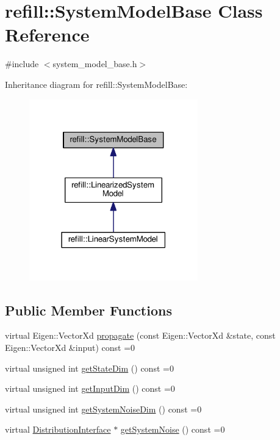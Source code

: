 \hypertarget{classrefill_1_1SystemModelBase}{}\section{refill\+:\+:System\+Model\+Base Class Reference}
\label{classrefill_1_1SystemModelBase}


{\ttfamily \#include $<$system\+\_\+model\+\_\+base.\+h$>$}



Inheritance diagram for refill\+:\+:System\+Model\+Base\+:\nopagebreak
\begin{figure}[H]
\begin{center}
\leavevmode
\includegraphics[width=207pt]{classrefill_1_1SystemModelBase__inherit__graph}
\end{center}
\end{figure}
\subsection*{Public Member Functions}
\begin{DoxyCompactItemize}
\item 
virtual Eigen\+::\+Vector\+Xd \hyperlink{classrefill_1_1SystemModelBase_a92d2c65291b3086f810e362cf4194eb0}{propagate} (const Eigen\+::\+Vector\+Xd \&state, const Eigen\+::\+Vector\+Xd \&input) const =0
\item 
virtual unsigned int \hyperlink{classrefill_1_1SystemModelBase_a55ce92b53dfdd8ba37dffc6c82a3e545}{get\+State\+Dim} () const =0
\item 
virtual unsigned int \hyperlink{classrefill_1_1SystemModelBase_a68947762564d303e72e7442f2f8673f8}{get\+Input\+Dim} () const =0
\item 
virtual unsigned int \hyperlink{classrefill_1_1SystemModelBase_a5920efd9833c9d13856e351eb05f679a}{get\+System\+Noise\+Dim} () const =0
\item 
virtual \hyperlink{classrefill_1_1DistributionInterface}{Distribution\+Interface} $\ast$ \hyperlink{classrefill_1_1SystemModelBase_a54bc6320db72f18aeff35598a4bee3a1}{get\+System\+Noise} () const =0
\end{DoxyCompactItemize}


